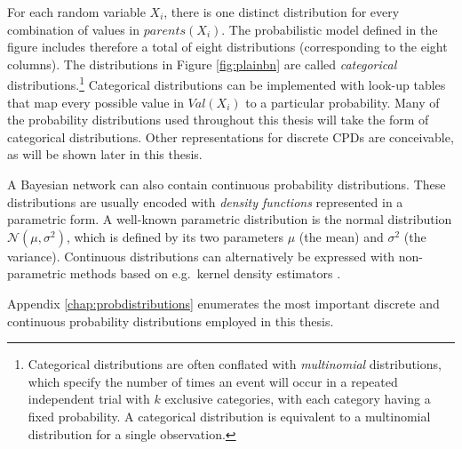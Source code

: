 
For each random variable $X_i$, there is one distinct distribution for every combination of values in $\mathit{parents}(X_i)$. The probabilistic model defined in the figure includes therefore a total of eight distributions (corresponding to the eight columns).  The distributions in Figure \ref{fig:plainbn} are called \textit{categorical} distributions.\footnote{Categorical distributions are often conflated with \textit{multinomial} distributions, which specify the number of times an event will occur in a repeated independent trial with $k$ exclusive categories, with each category having a fixed probability.  A categorical distribution is equivalent to a multinomial distribution for a single observation.} Categorical distributions can be implemented with look-up tables that map every possible value in $\mathit{Val}(X_i)$ to a particular probability.  Many of the probability distributions used throughout this thesis will take the form of categorical distributions. Other representations for discrete CPDs are conceivable, as will be shown later in this thesis.

A Bayesian network can also contain continuous probability distributions.  These distributions are usually encoded with \textit{density functions} represented in a parametric form.  A well-known parametric distribution is the normal distribution $\mathcal{N}(\mu,\sigma^2)$, which is defined by its two parameters $\mu$ (the mean) and $\sigma^2$ (the variance). Continuous distributions can alternatively be expressed with non-parametric methods based on e.g.\ kernel density estimators \cite[see e.g.][for more details on these continuous distributions]{Bishop:2006,Koller+Friedman:09}.


Appendix \ref{chap:probdistributions} enumerates the most important discrete and continuous probability distributions employed in this thesis.  %

